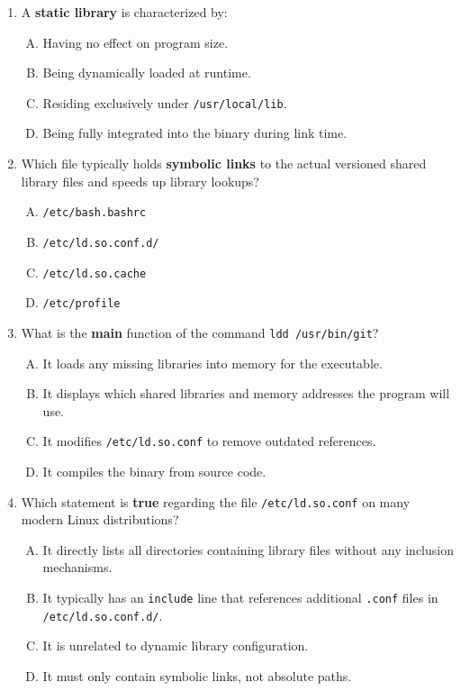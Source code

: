 \documentclass[a4paper]{report}
\begin{document}
\begin{enumerate}[1.]
    \item A \textbf{static library} is characterized by:  
    \begin{enumerate}[A)]
        \item Having no effect on program size.  
        \item Being dynamically loaded at runtime.  
        \item Residing exclusively under \texttt{/usr/local/lib}.  
        \item Being fully integrated into the binary during link time.  
    \end{enumerate}

    \item Which file typically holds \textbf{symbolic links} to the actual versioned shared library files and speeds up library lookups?  
    \begin{enumerate}[A)]
        \item \texttt{/etc/bash.bashrc}  
        \item \texttt{/etc/ld.so.conf.d/}  
        \item \texttt{/etc/ld.so.cache}  
        \item \texttt{/etc/profile}  
    \end{enumerate}

    \item What is the \textbf{main} function of the command \texttt{ldd /usr/bin/git}?  
    \begin{enumerate}[A)]
        \item It loads any missing libraries into memory for the executable.  
        \item It displays which shared libraries and memory addresses the program will use.  
        \item It modifies \texttt{/etc/ld.so.conf} to remove outdated references.  
        \item It compiles the binary from source code.  
    \end{enumerate}

    \item Which statement is \textbf{true} regarding the file \texttt{/etc/ld.so.conf} on many modern Linux distributions?  
    \begin{enumerate}[A)]
        \item It directly lists all directories containing library files without any inclusion mechanisms.  
        \item It typically has an \texttt{include} line that references additional \texttt{.conf} files in \texttt{/etc/ld.so.conf.d/}.  
        \item It is unrelated to dynamic library configuration.  
        \item It must only contain symbolic links, not absolute paths.  
    \end{enumerate}


\end{enumerate}
\end{document}
